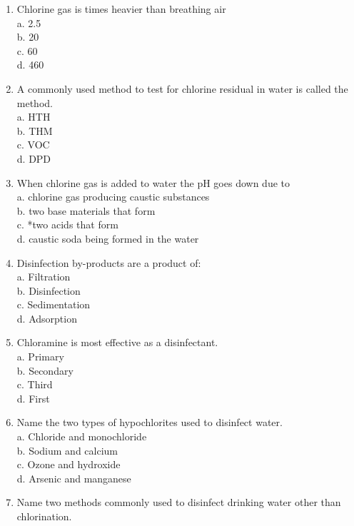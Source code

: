 \begin{enumerate}[1.]
\item Chlorine gas is times heavier than breathing air\\
a. 2.5\\
b. 20\\
c. 60\\
d. 460\\
\item A commonly used method to test for chlorine residual in water is called the method.\\
a. HTH\\
b. THM\\
c. VOC\\
d. DPD\\
\item When chlorine gas is added to water the $\mathrm{pH}$ goes down due to\\
a. chlorine gas producing caustic substances\\
b. two base materials that form\\
c. *two acids that form\\
d. caustic soda being formed in the water\\
\item Disinfection by-products are a product of:\\
a. Filtration\\
b. Disinfection\\
c. Sedimentation\\
d. Adsorption\\
\item Chloramine is most effective as a disinfectant.\\
a. Primary\\
b. Secondary\\
c. Third\\
d. First\\
\item Name the two types of hypochlorites used to disinfect water.\\
a. Chloride and monochloride\\
b. Sodium and calcium\\
c. Ozone and hydroxide\\
d. Arsenic and manganese\\
\item Name two methods commonly used to disinfect drinking water other than chlorination.\\

\end{enumerate}
